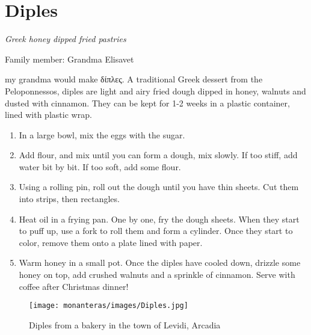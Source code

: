 \chapter{Diples}
\label{ch:diples}


\textit{Greek honey dipped fried pastries}

Family member: Grandma Elisavet

 my grandma would make \textgreek{δίπλες}. A traditional Greek dessert from the Peloponnessos, diples are light and airy fried dough dipped in honey, walnuts and dusted with cinnamon. They can be kept for 1-2 weeks in a plastic container, lined with plastic wrap.

\begin{enumerate}
    \item In a large bowl, mix the eggs with the sugar. 
    \item Add flour, and mix until you can form a dough, mix slowly. If too stiff, add water bit by bit. If too soft, add some flour.
    \item Using a rolling pin, roll out the dough until you have thin sheets. Cut them into strips, then rectangles.
    \item Heat oil in a frying pan. One by one, fry the dough sheets. When they start to puff up, use a fork to roll them and form a cylinder. Once they start to color, remove them onto a plate lined with paper.
    \item Warm honey in a small pot. Once the diples have cooled down, drizzle some honey on top, add crushed walnuts and a sprinkle of cinnamon. Serve with coffee after Christmas dinner!
\end{enumerate}

\begin{figure}
  \texttt{[image: monanteras/images/Diples.jpg]}
  \caption{Diples from a bakery in the town of Levidi, Arcadia}
\end{figure}
